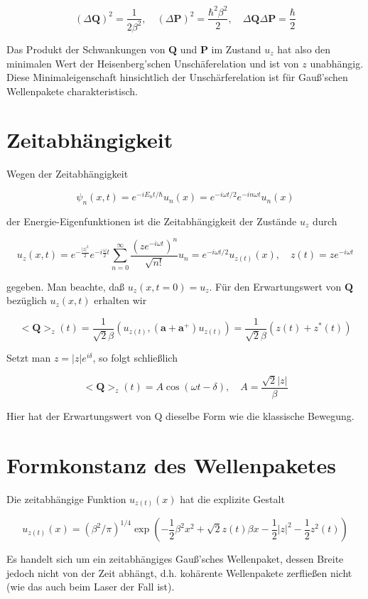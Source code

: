 \documentclass[10pt, letterpaper]{article}
\begin{document}
$$
(\Delta \mathbf{Q})^{2}=\frac{1}{2 \beta^{2}}, \quad(\Delta \mathbf{P})^{2}=\frac{\hbar^{2} \beta^{2}}{2}, \quad \Delta \mathbf{Q} \Delta \mathbf{P}=\frac{\hbar}{2}
$$

Das Produkt der Schwankungen von $\mathbf{Q}$ und $\mathbf{P}$ im Zustand $u_{z}$ hat also den minimalen Wert der Heisenberg'schen Unschäferelation und ist von $z$ unabhängig. Diese Minimaleigenschaft hinsichtlich der Unschärferelation ist für Gauß'schen Wellenpakete charakteristisch.

\section*{Zeitabhängigkeit}
Wegen der Zeitabhängigkeit

$$
\psi_{n}(x, t)=e^{-i E_{n} t / \hbar} u_{n}(x)=e^{-i \omega t / 2} e^{-i n \omega t} u_{n}(x)
$$

der Energie-Eigenfunktionen ist die Zeitabhängigkeit der Zustände $u_{z}$ durch

$$
u_{z}(x, t)=e^{-\frac{|z|^{2}}{2}} e^{-i \frac{\omega}{2} t} \sum_{n=0}^{\infty} \frac{\left(z e^{-i \omega t}\right)^{n}}{\sqrt{n!}} u_{n}=e^{-i \omega t / 2} u_{z(t)}(x), \quad z(t)=z e^{-i \omega t}
$$

gegeben. Man beachte, daß $u_{z}(x, t=0)=u_{z}$. Für den Erwartungswert von $\mathbf{Q}$ bezüglich $u_{z}(x, t)$ erhalten wir

$$
<\mathbf{Q}>_{z}(t)=\frac{1}{\sqrt{2} \beta}\left(u_{z(t)},\left(\mathbf{a}+\mathbf{a}^{+}\right) u_{z(t)}\right)=\frac{1}{\sqrt{2} \beta}\left(z(t)+z^{*}(t)\right)
$$

Setzt man $z=|z| e^{i \delta}$, so folgt schließlich

$$
<\mathbf{Q}>_{z}(t)=A \cos (\omega t-\delta), \quad A=\frac{\sqrt{2}|z|}{\beta}
$$

Hier hat der Erwartungswert von Q dieselbe Form wie die klassische Bewegung.

\section*{Formkonstanz des Wellenpaketes}
Die zeitabhängige Funktion $u_{z(t)}(x)$ hat die explizite Gestalt

$$
u_{z(t)}(x)=\left(\beta^{2} / \pi\right)^{1 / 4} \exp \left(-\frac{1}{2} \beta^{2} x^{2}+\sqrt{2} z(t) \beta x-\frac{1}{2}|z|^{2}-\frac{1}{2} z^{2}(t)\right)
$$

Es handelt sich um ein zeitabhängiges Gauß'sches Wellenpaket, dessen Breite jedoch nicht von der Zeit abhängt, d.h. kohärente Wellenpakete zerfließen nicht (wie das auch beim Laser der Fall ist).
\end{document}
